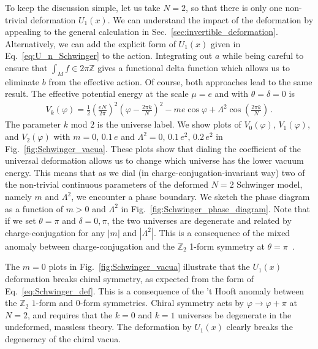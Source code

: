 \documentclass[11pt]{article}
\def\ZZ{\mathbb{Z}}
\begin{document}
To keep the discussion simple, let us take $N=2$, so that there is only one non-trivial deformation $U_{1}(x)$. We can understand the impact of the deformation by appealing to the general calculation in Sec.~\ref{sec:invertible_deformation}.  Alternatively, we can add the explicit form of $U_1(x)$ given in Eq.~\eqref{eq:U_n_Schwinger} to the action.  Integrating out $a$ while being careful to ensure that $\int_M f \in 2\pi \mathbb{Z}$ gives a functional delta function which allows us to eliminate $b$ from the effective action.  Of course, both approaches lead to the same result.  The effective potential energy at the scale $\mu = e$ and with $\theta = \delta = 0$ is 
\begin{align}
V_k(\varphi) = \frac{1}{2}\left(\frac{eN}{2\pi}\right)^2\left(\varphi-\frac{2\pi k}{N}\right)^2 -m e\cos\varphi + \Lambda^2 \cos\left(\frac{2\pi k}{N}\right) \,.
\label{eq:Schwinger_V}
\end{align}
The parameter $k$ mod $2$ is the universe label. We show plots of $V_0(\varphi)$,  $V_1(\varphi)$, and $V_2(\varphi)$ with $m = 0,\, 0.1\, e$ and $\Lambda^2 = 0,\, 0.1\,e^2,\, 0.2\,e^2$ in Fig.~\ref{fig:Schwinger_vacua}. 
These plots show that dialing the coefficient of the universal deformation allows us to change which universe has the lower vacuum energy. This means that as we dial (in charge-conjugation-invariant way) two of the non-trivial continuous parameters of the deformed $N=2$ Schwinger model, namely $m$ and $\Lambda^2$, we encounter a phase boundary.  We sketch the phase diagram as a function of $m>0$ and $\Lambda^2$ in Fig.~\ref{fig:Schwinger_phase_diagram}. Note that if we set $\theta = \pi$ and $\delta = 0,\pi$, the two universes are degenerate and related by charge-conjugation for any $|m|$ and $|\Lambda^2|$. This is a consequence of the mixed anomaly between charge-conjugation and the $\ZZ_2$ 1-form symmetry at $\theta = \pi$~\cite{Komargodski:2017dmc}.

The $m=0$ plots in Fig.~\ref{fig:Schwinger_vacua} illustrate that the $U_1(x)$ deformation breaks chiral symmetry, as expected from the form of Eq.~\eqref{eq:Schwinger_def}. This is a consequence of the 't Hooft anomaly between the $\mathbb{Z}_2$ $1$-form and $0$-form symmetries. Chiral symmetry acts by $\varphi \to \varphi +\pi$ at $N=2$, and requires that the $k=0$ and $k=1$ universes be degenerate in the undeformed, massless theory. The deformation by $U_1(x)$ clearly breaks the degeneracy of the chiral vacua. 
\end{document}
